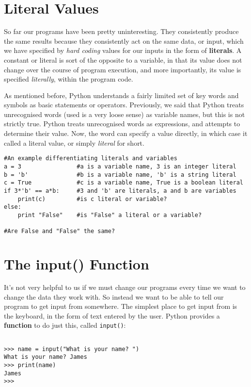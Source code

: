 
\section{Literal Values}

So far our programs have been pretty uninteresting. They     consistently produce the same results because they consistently act on     the same data, or input, which we have specified by \textit{hard       coding} values for our inputs in the form of     \textbf{literals}. A constant or literal is sort of the opposite to a     variable, in that its value does not change over the course of program     execution, and more importantly, its value is specified     \textit{literally}, within the program code.

As mentioned before, Python understands a fairly limited set of key     words and symbols as basic statements or operators. Previously, we     said that Python treats unrecognised words (used is a very loose sense)     as variable names, but this is not strictly true. Python treats     unrecognised words as expressions, and attempts to determine their     value. Now, the word can specify a value directly, in which case it     called a literal value, or simply \textit{literal} for short. 
\begin{lstlisting}
#An example differentiating literals and variables
a = 3                #a is a variable name, 3 is an integer literal
b = 'b'              #b is a variable name, 'b' is a string literal
c = True             #c is a variable name, True is a boolean literal
if 3*'b' == a*b:     #3 and 'b' are literals, a and b are variables
    print(c)         #is c literal or variable?
else:                
    print "False"    #is "False" a literal or a variable?

#Are False and "False" the same?
\end{lstlisting}

\section{The input() Function}

It's not very helpful to us if we must change our programs every     time we want to change the data they work with. So instead we want to     be able to tell our program to get input from somewhere. The simplest     place to get input from is the keyboard, in the form of text entered by     the user. Python provides a \textbf{function} to do just this,     called \texttt{input()}:
\begin{lstlisting}

>>> name = input("What is your name? ")
What is your name? James
>>> print(name)
James
>>>
\end{lstlisting}

